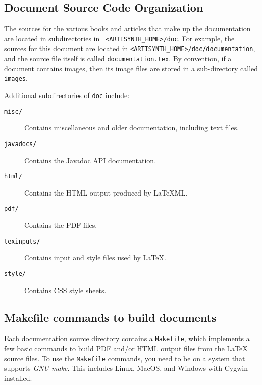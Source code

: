 \documentclass{article}
\begin{document}
\subsection{Document Source Code Organization}

The sources for the various books and articles that make up the
documentation are located in subdirectories in {\tt
<ARTISYNTH\_HOME>/doc}.  For example, the sources for this document
are located in {\tt <ARTISYNTH\_HOME>/doc/documentation}, and the
source file itself is called {\tt documentation.tex}. 
By convention, if a
document contains images, then its image files are stored in a
sub-directory called {\tt images}.

Additional subdirectories of {\tt doc} include:

\begin{description}

\item[{\tt misc/}] \mbox{}

Contains miscellaneous and older documentation, including
text files.

\item[{\tt javadocs/}] \mbox{}

Contains the Javadoc API documentation.

\item[{\tt html/}] \mbox{}

Contains the HTML output produced by LaTeXML.

\item[{\tt pdf/}] \mbox{}

Contains the PDF files.

\item[{\tt texinputs/}] \mbox{}

Contains input and style files used by LaTeX.

\item[{\tt style/}] \mbox{}

Contains CSS style sheets.

\end{description}

\subsection{Makefile commands to build documents}
\label{DocumentCreationSec}

Each documentation source directory contains a {\tt Makefile}, which
implements a few basic commands to build PDF and/or HTML output files
from the LaTeX source files.  To use the {\tt Makefile} commands, you
need to be on a system that supports {\it GNU make}. This includes
Linux, MacOS, and Windows with Cygwin installed.
\end{document}
